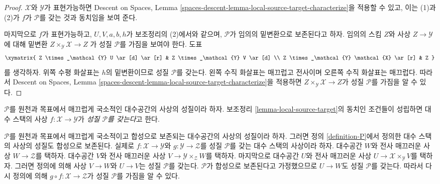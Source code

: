 \begin{proof}
\medskip\noindent
$\mathcal{X}$와 $\mathcal{Y}$가 표현가능하면 Descent on Spaces, Lemma
\ref{spaces-descent-lemma-local-source-target-characterize}을 적용할 수 있고,
이는 (1)과 (2)가 $f$가 $\mathcal{P}$를 갖는 것과 동치임을 보여 준다.

\medskip\noindent
마지막으로 $f$가 표현가능하고, $U, V, a, b, h$가 보조정리의 (2)에서와
같으며, $\mathcal{P}$가 임의의 밑변환으로 보존된다고 하자. 임의의 스킴
$Z$와 사상 $Z \to \mathcal{Y}$에 대해 밑변환
$Z \times_\mathcal{Y} \mathcal{X} \to Z$
가 성질 $\mathcal{P}$를 가짐을 보여야 한다. 도표
$$
\xymatrix{
Z \times_\mathcal{Y} U \ar[d] \ar[r] &
Z \times_\mathcal{Y} V \ar[d] \\
Z \times_\mathcal{Y} \mathcal{X} \ar[r] &
Z
}
$$
를 생각하자. 위쪽 수평 화살표는 $h$의 밑변환이므로 성질
$\mathcal{P}$를 갖는다. 왼쪽 수직 화살표는 매끄럽고 전사이며 오른쪽
수직 화살표는 매끄럽다. 따라서 Descent on Spaces, Lemma
\ref{spaces-descent-lemma-local-source-target-characterize}을 적용하면
$Z \times_\mathcal{Y} \mathcal{X} \to Z$가 성질 $\mathcal{P}$를
가짐을 알 수 있다.
\end{proof}

\begin{definition}
\label{definition-P}
$\mathcal{P}$를 원천과 목표에서 매끄럽게 국소적인 대수공간의 사상의
성질이라 하자. 보조정리 \ref{lemma-local-source-target}의 동치인 조건들이
성립하면 대수 스택의 사상 $f : \mathcal{X} \to \mathcal{Y}$가
{\it 성질 $\mathcal{P}$를 갖는다}고 한다.
\end{definition}

\begin{remark}
\label{remark-composition}
$\mathcal{P}$를 원천과 목표에서 매끄럽게 국소적이고 합성으로 보존되는
대수공간의 사상의 성질이라 하자. 그러면 정의 \ref{definition-P}에서
정의한 대수 스택의 사상의 성질도 합성으로 보존된다. 실제로
$f : \mathcal{X} \to \mathcal{Y}$와 $g : \mathcal{Y} \to \mathcal{Z}$를
성질 $\mathcal{P}$를 갖는 대수 스택의 사상이라 하자. 대수공간 $W$와
전사 매끄러운 사상 $W \to \mathcal{Z}$를 택하자. 대수공간 $V$와
전사 매끄러운 사상 $V \to \mathcal{Y} \times_\mathcal{Z} W$를 택하자.
마지막으로 대수공간 $U$와 전사 매끄러운 사상
$U \to \mathcal{X} \times_\mathcal{Y} V$를 택하자. 그러면 정의에 의해
사상 $V \to W$와 $U \to V$는 성질 $\mathcal{P}$를 갖는다.
$\mathcal{P}$가 합성으로 보존된다고 가정했으므로 $U \to W$도 성질
$\mathcal{P}$를 갖는다. 따라서 다시 정의에 의해
$g \circ f : \mathcal{X} \to \mathcal{Z}$가 성질 $\mathcal{P}$를
가짐을 알 수 있다.
\end{remark}

